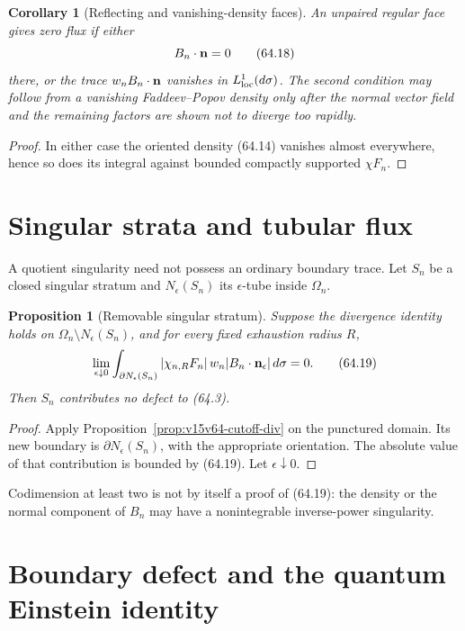 \documentclass[11pt]{article}
\newtheorem{proposition}[theorem]{Proposition}
\newtheorem{corollary}[theorem]{Corollary}
\theoremstyle{remark}
\begin{document}
\begin{corollary}[Reflecting and vanishing-density faces]
\label{cor:v15v64-reflecting}
An unpaired regular face gives zero flux if either
\[
 B_n\mathbin{\cdot}{\bf n}=0                          \tag{64.18}
\]
there, or the trace \(w_nB_n\mathbin{\cdot}{\bf n}\)
vanishes in \(L^1_{\rm loc}(d\sigma)\).  The second condition may
follow from a vanishing Faddeev--Popov density only after the normal
vector field and the remaining factors are shown not to diverge
too rapidly.
\end{corollary}

\begin{proof}
In either case the oriented density (64.14) vanishes almost
everywhere, hence so does its integral against bounded compactly
supported \(\chi F_n\).
\end{proof}

\section{Singular strata and tubular flux}

A quotient singularity need not possess an ordinary boundary
trace.  Let \(S_n\) be a closed singular stratum and
\(N_\epsilon(S_n)\) its \(\epsilon\)-tube inside \(\Omega_n\).

\begin{proposition}[Removable singular stratum]
\label{prop:v15v64-tube}
Suppose the divergence identity holds on
\(\Omega_n\setminus N_\epsilon(S_n)\), and for every fixed
exhaustion radius \(R\),
\[
 \lim_{\epsilon\downarrow0}
 \int_{\partial N_\epsilon(S_n)}
 |\chi_{n,R}F_n|\,w_n
 |B_n\mathbin{\cdot}{\bf n}_\epsilon|\,d\sigma=0.       \tag{64.19}
\]
Then \(S_n\) contributes no defect to (64.3).
\end{proposition}

\begin{proof}
Apply Proposition~\ref{prop:v15v64-cutoff-div} on the punctured
domain.  Its new boundary is
\(\partial N_\epsilon(S_n)\), with the appropriate orientation.
The absolute value of that contribution is bounded by (64.19).
Let \(\epsilon\downarrow0\).
\end{proof}

Codimension at least two is not by itself a proof of (64.19):
the density or the normal component of \(B_n\) may have a
nonintegrable inverse-power singularity.

\section{Boundary defect and the quantum Einstein identity}
\end{document}
